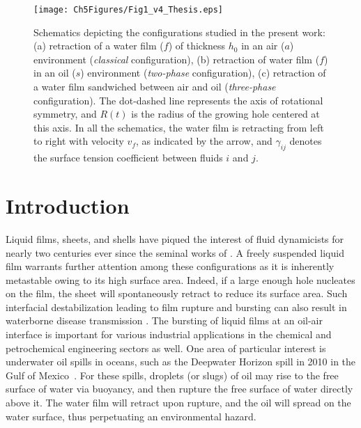 \begin{sidewaysfigure}
	\centering
	\texttt{[image: Ch5Figures/Fig1\_v4\_Thesis.eps]}
	\caption{Schematics depicting the configurations studied in the present work: (a) retraction of a water film ($f$) of thickness $h_0$ in an air ($a$) environment (\emph{classical} configuration),  (b) retraction of water film ($f$) in an oil ($s$) environment (\emph{two-phase} configuration), (c) retraction of a water film sandwiched between air and oil (\emph{three-phase} configuration). The dot-dashed line represents the axis of rotational symmetry, and $R(t)$ is the radius of the growing hole centered at this axis. In all the schematics, the water film is retracting from left to right with velocity $v_f$, as indicated by the arrow, and $\gamma_{ij}$ denotes the surface tension coefficient between fluids $i$ and $j$.}
	\label{Ch6:fig:configs}
\end{sidewaysfigure}

\section{Introduction}\label{Ch6:Intro}

Liquid films, sheets, and shells have piqued the interest of fluid dynamicists \citep{clanet2007waterbells, villermaux2020fragmentation} for nearly two centuries ever since the seminal works of \citet{savart1833oppositejets, savart1833waterbells, savart1833hydraulicjump, taylor1959dynamics, taylor-1959-procrsoclonda}. A freely suspended liquid film warrants further attention among these configurations as it is inherently metastable owing to its high surface area. Indeed, if a large enough \citep{taylor1973making, villermaux2020fragmentation} hole nucleates on the film, the sheet will spontaneously retract to reduce its surface area. Such interfacial destabilization leading to film rupture and bursting can also result in waterborne disease transmission \citep{bourouiba2021fluid}. The bursting of liquid films at an oil-air interface is important for various industrial applications in the chemical and petrochemical engineering sectors as well. One area of particular interest is underwater oil spills in oceans, such as the Deepwater Horizon spill in 2010 in the Gulf of Mexico~\citep{summerhayes2011deep}. For these spills, droplets (or slugs) of oil may rise to the free surface of water via buoyancy, and then rupture the free surface of water directly above it. The water film will retract upon rupture, and the oil will spread on the water surface, thus perpetuating an environmental hazard. 

